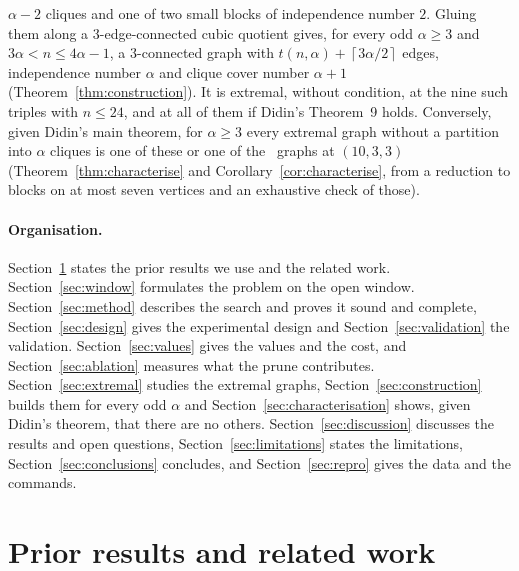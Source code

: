 \documentclass[11pt]{article}
\theoremstyle{definition}
\theoremstyle{remark}
\newcommand{\ceil}[1]{\left\lceil #1\right\rceil}
\begin{document}
\begin{enumerate}
$\alpha-2$ cliques and one of two small blocks of independence number $2$. Gluing them along a
$3$-edge-connected cubic quotient gives, for every odd $\alpha\ge3$ and $3\alpha<n\le4\alpha-1$, a $3$-connected
graph with $t(n,\alpha)+\ceil{3\alpha/2}$ edges, independence number $\alpha$ and clique cover number $\alpha+1$
(Theorem~\ref{thm:construction}). It is extremal, without condition, at the nine such triples with $n\le24$, and at
all of them if Didin's Theorem~9 holds. Conversely, given Didin's main theorem, for $\alpha\ge3$ every extremal graph
without a partition into $\alpha$ cliques is one of these or one of the \ntenthreeb\ graphs at $(10,3,3)$
(Theorem~\ref{thm:characterise} and Corollary~\ref{cor:characterise}, from a reduction to blocks on at most seven
vertices and an exhaustive check of those).
\end{enumerate}

\paragraph{Organisation.} Section~\ref{sec:prior} states the prior results we use and the related work.
Section~\ref{sec:window} formulates the problem on the open window. Section~\ref{sec:method} describes the search and
proves it sound and complete, Section~\ref{sec:design} gives the experimental design and Section~\ref{sec:validation}
the validation. Section~\ref{sec:values} gives the values and the cost, and Section~\ref{sec:ablation} measures what the
prune contributes. Section~\ref{sec:extremal} studies the extremal graphs, Section~\ref{sec:construction} builds them
for every odd $\alpha$ and Section~\ref{sec:characterisation} shows, given Didin's theorem, that there are no others.
Section~\ref{sec:discussion} discusses the results and open questions, Section~\ref{sec:limitations} states the
limitations, Section~\ref{sec:conclusions} concludes, and Section~\ref{sec:repro} gives the data and the commands.

\section{Prior results and related work}\label{sec:prior}
\end{document}
